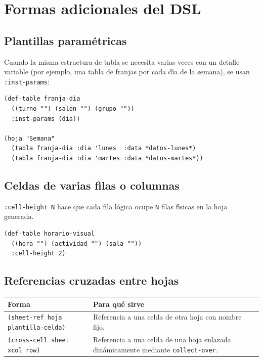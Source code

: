 \documentclass[12pt,a4paper]{report}
\begin{document}
\section{Formas adicionales del DSL}
\label{sec:macros-extra}

\subsection*{Plantillas param\'etricas}

Cuando la misma estructura de tabla se necesita varias veces con un detalle
variable (por ejemplo, una tabla de franjas por cada d\'{\i}a de la semana),
se usan \texttt{:inst-params}:

\begin{lstlisting}
(def-table franja-dia
  ((turno "") (salon "") (grupo ""))
  :inst-params (dia))

(hoja "Semana"
  (tabla franja-dia :dia 'lunes  :data *datos-lunes*)
  (tabla franja-dia :dia 'martes :data *datos-martes*))
\end{lstlisting}

\subsection*{Celdas de varias filas o columnas}

\texttt{:cell-height~N} hace que cada fila l\'ogica ocupe \texttt{N} filas
f\'{\i}sicas en la hoja generada.

\begin{lstlisting}
(def-table horario-visual
  ((hora "") (actividad "") (sala ""))
  :cell-height 2)
\end{lstlisting}

\subsection*{Referencias cruzadas entre hojas}

\begin{center}
\begin{tabular}{lp{8cm}}
\toprule
\textbf{Forma} & \textbf{Para qu\'e sirve} \\
\midrule
\texttt{(sheet-ref hoja plantilla-celda)} & Referencia a una celda de
  otra hoja con nombre fijo. \\
\texttt{(cross-cell sheet xcol row)} & Referencia a una celda de una hoja
  enlazada din\'amicamente mediante \texttt{collect-over}. \\
\bottomrule
\end{tabular}
\end{center}
\end{document}
